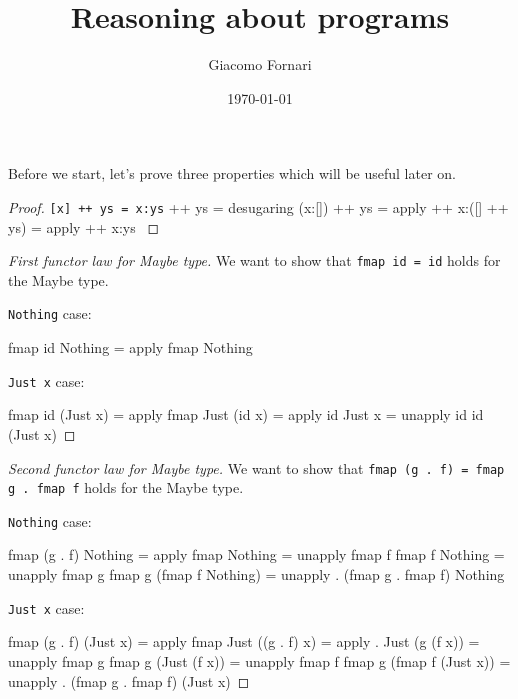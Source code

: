 \documentclass[12pt]{article}
\title{Reasoning about programs}
\author{Giacomo Fornari}
\date{\today}
\newenvironment{code}{\endgraf\verbatim}{\endverbatim}
\begin{document}
\maketitle

Before we start, let's prove three properties which will be useful later on.

\begin{proof} \verb|[x] ++ ys = x:ys|
\begin{code}
  [x] ++ ys
=   { desugaring }
  (x:[]) ++ ys
=   { apply ++ }
  x:([] ++ ys)
=   { apply ++ }
  x:ys
\end{code}
\end{proof}


\begin{proof}[First functor law for Maybe type]

We want to show that \verb|fmap id = id| holds for the Maybe type.

\verb|Nothing| case:

\begin{code}
  fmap id Nothing
=   { apply fmap }
  Nothing
\end{code}

\verb|Just x| case:

\begin{code}
  fmap id (Just x)
=   { apply fmap }
  Just (id x)
=   { apply id }
  Just x
=   { unapply id }
  id (Just x)
\end{code}
\end{proof}


\begin{proof}[Second functor law for Maybe type]

We want to show that \verb|fmap (g . f) = fmap g . fmap f| holds for the Maybe type.

\verb |Nothing| case:

\begin{code}
  fmap (g . f) Nothing
=   { apply fmap }
  Nothing
=   { unapply fmap f }
  fmap f Nothing
=   { unapply fmap g }
  fmap g (fmap f Nothing)
=   { unapply . }
  (fmap g . fmap f) Nothing
\end{code}

\verb|Just x| case:

\begin{code}
  fmap (g . f) (Just x)
=   { apply fmap }
  Just ((g . f) x)
=   { apply . }
  Just (g (f x))
=   { unapply fmap g }
  fmap g (Just (f x))
=   { unapply fmap f }
  fmap g (fmap f (Just x))
=   { unapply . }
  (fmap g . fmap f) (Just x)
\end{code}
\end{proof}
\end{document}
